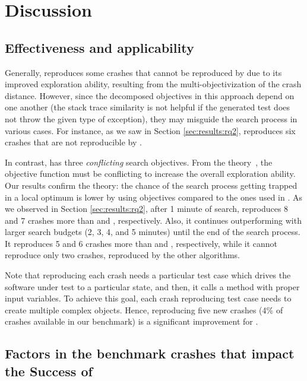 \section{Discussion}
\label{sec:discussion}

\subsection{Effectiveness and applicability}
Generally, \decomposition reproduces some crashes that cannot be reproduced by \SGGA due to its improved exploration ability, resulting from the multi-objectivization of the crash distance. However, since the decomposed objectives in this approach depend on one another (\eg the stack trace similarity is not helpful if the generated test does not throw the given type of exception), they may misguide the search process in various cases. For instance, as we saw in Section \ref{sec:results:rq2}, \SGGA reproduces six crashes that are not reproducible by \decomposition.

In contrast, \moho has three \textit{conflicting} search objectives. From the theory~\cite{jensen2004helper}, the objective function must be conflicting to increase the overall exploration ability. Our results confirm the theory: the chance of the search process getting trapped in a local optimum is lower by using \moho objectives compared to the ones used in \decomposition. As we observed in Section \ref{sec:results:rq2}, after 1 minute of search, \moho reproduces 8 and 7 crashes more than \SGGA and \decomposition, respectively. Also, it continues outperforming with larger search budgets (2, 3, 4, and 5 minutes) until the end of the search process. It reproduces 5 and 6 crashes more than \SGGA and \decomposition, respectively, while it cannot reproduce only two crashes, reproduced by the other algorithms.

Note that reproducing each crash needs a particular test case which drives the software under test to a particular state, and then, it calls a method with proper input variables. To achieve this goal, each crash reproducing test case needs to create multiple complex objects. Hence, reproducing five new crashes (4\% of crashes available in our benchmark) is a significant improvement for \moho.

\subsection{Factors in the benchmark crashes that impact the Success of \moho}
\label{sec:discussion:factors}

